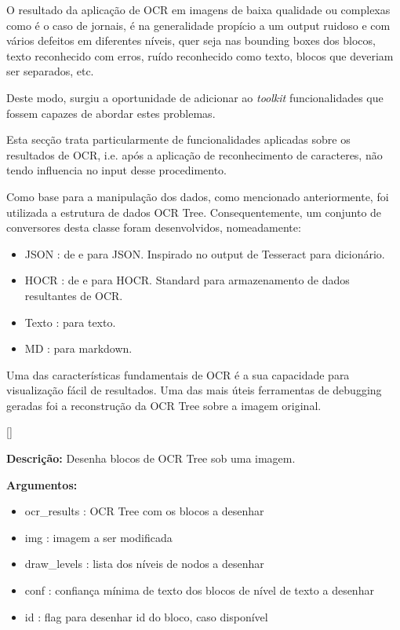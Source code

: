 O resultado da aplicação de OCR em imagens de baixa qualidade ou complexas como é o caso de jornais, é na generalidade propício a um output ruidoso e com vários defeitos em diferentes níveis, quer seja nas bounding boxes dos blocos, texto reconhecido com erros, ruído reconhecido como texto, blocos que deveriam ser separados, etc. 


Deste modo, surgiu a oportunidade de adicionar ao \textit{toolkit} funcionalidades que fossem capazes de abordar estes problemas.

Esta secção trata particularmente de funcionalidades aplicadas sobre os resultados de OCR, i.e. após a aplicação de reconhecimento de caracteres, não tendo influencia no input desse procedimento.


\label{ocr_results_conversion}

Como base para a manipulação dos dados, como mencionado anteriormente, foi utilizada a estrutura de dados OCR Tree. Consequentemente, um conjunto de conversores desta classe foram desenvolvidos, nomeadamente:

\begin{itemize}
	\item JSON : de e para JSON. Inspirado no output de Tesseract para dicionário.
	\item HOCR : de e para HOCR. Standard para armazenamento de dados resultantes de OCR.
	\item Texto : para texto.
	\item MD : para markdown.
\end{itemize}


\label{contribution_debugging}

Uma das características fundamentais de OCR é a sua capacidade para visualização fácil de resultados. Uma das mais úteis ferramentas de debugging geradas foi a reconstrução da OCR Tree sobre a imagem original.

[\normalsize]

\textbf{Descrição:} Desenha blocos de OCR Tree sob uma imagem.

\textbf{Argumentos:}
\begin{itemize}\setlength\itemsep{-0.3em}
	\item ocr\_results : OCR Tree com os blocos a desenhar
	\item img : imagem a ser modificada
	\item draw\_levels : lista dos níveis de nodos a desenhar
	\item conf : confiança mínima de texto dos blocos de nível de texto a desenhar
	\item id : flag para desenhar id do bloco, caso disponível
\end{itemize}


